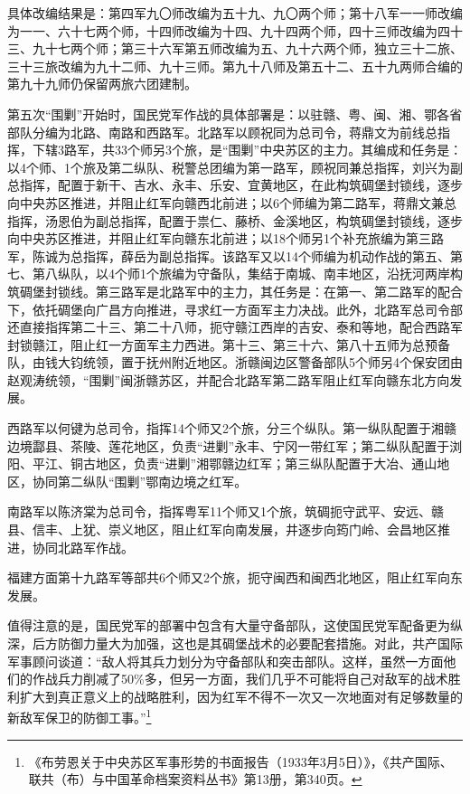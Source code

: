 具体改编结果是：第四军九〇师改编为五十九、九〇两个师；第十八军一一师改编为一一、六十七两个师，十四师改编为十四、九十四两个师，四十三师改编为四十三、九十七两个师；第三十六军第五师改编为五、九十六两个师，独立三十二旅、三十三旅改编为九十二师、九十三师。第九十八师及第五十二、五十九两师合编的第九十九师仍保留两旅六团建制。


第五次“围剿”开始时，国民党军作战的具体部署是：以驻赣、粤、闽、湘、鄂各省部队分编为北路、南路和西路军。北路军以顾祝同为总司令，蒋鼎文为前线总指挥，下辖3路军，共33个师另3个旅，是“围剿”中央苏区的主力。其编成和任务是：以4个师、1个旅及第二纵队、税警总团编为第一路军，顾祝同兼总指挥，刘兴为副总指挥，配置于新干、吉水、永丰、乐安、宜黄地区，在此构筑碉堡封锁线，逐步向中央苏区推进，并阻止红军向赣西北前进；以6个师编为第二路军，蒋鼎文兼总指挥，汤恩伯为副总指挥，配置于祟仁、藤桥、金溪地区，构筑碉堡封锁线，逐步向中央苏区推进，并阻止红军向赣东北前进；以18个师另1个补充旅编为第三路军，陈诚为总指挥，薛岳为副总指挥。该路军又以14个师编为机动作战的第五、第七、第八纵队，以4个师1个旅编为守备队，集结于南城、南丰地区，沿抚河两岸构筑碉堡封锁线。第三路军是北路军中的主力，其任务是：在第一、第二路军的配合下，依托碉堡向广昌方向推进，寻求红一方面军主力决战。此外，北路军总司令部还直接指挥第二十三、第二十八师，扼守赣江西岸的吉安、泰和等地，配合西路军封锁赣江，阻止红一方面军主力西进。第十三、第三十六、第八十五师为总预备队，由钱大钧统领，置于抚州附近地区。浙赣闽边区警备部队5个师另4个保安团由赵观涛统领，“围剿”闽浙赣苏区，并配合北路军第二路军阻止红军向赣东北方向发展。


西路军以何键为总司令，指挥14个师又2个旅，分三个纵队。第一纵队配置于湘赣边境酃县、茶陵、莲花地区，负责“进剿”永丰、宁冈一带红军；第二纵队配置于浏阳、平江、铜古地区，负责“进剿”湘鄂赣边红军；第三纵队配置于大冶、通山地区，协同第二纵队“围剿”鄂南边境之红军。


南路军以陈济棠为总司令，指挥粤军11个师又1个旅，筑碉扼守武平、安远、赣县、信丰、上犹、崇义地区，阻止红军向南发展，井逐步向筠门岭、会昌地区推进，协同北路军作战。


福建方面第十九路军等部共6个师又2个旅，扼守闽西和闽西北地区，阻止红军向东发展。


值得注意的是，国民党军的部署中包含有大量守备部队，这使国民党军配备更为纵深，后方防御力量大为加强，这也是其碉堡战术的必要配套措施。对此，共产国际军事顾问谈道：“敌人将其兵力划分为守备部队和突击部队。这样，虽然一方面他们的作战兵力削减了50\%多，但另一方面，我们几乎不可能将自己对敌军的战术胜利扩大到真正意义上的战略胜利，因为红军不得不一次又一次地面对有足够数量的新敌军保卫的防御工事。”\footnote{《布劳恩关于中央苏区军事形势的书面报告（1933年3月5日）》，《共产国际、联共（布）与中国革命档案资料丛书》第13册，第340页。}


